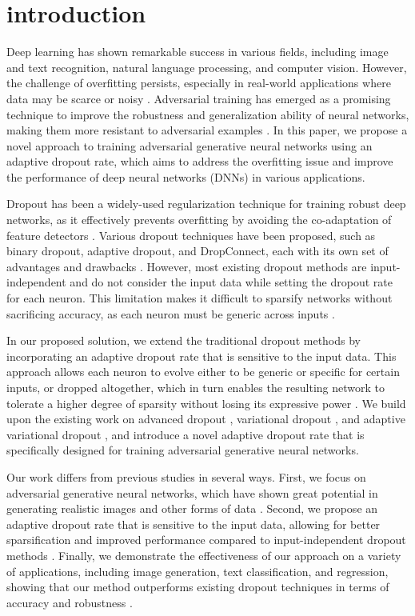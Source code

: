 \section{introduction}
Deep learning has shown remarkable success in various fields, including image and text recognition, natural language processing, and computer vision. However, the challenge of overfitting persists, especially in real-world applications where data may be scarce or noisy \cite{2010.05244}. Adversarial training has emerged as a promising technique to improve the robustness and generalization ability of neural networks, making them more resistant to adversarial examples \cite{2108.08976}. In this paper, we propose a novel approach to training adversarial generative neural networks using an adaptive dropout rate, which aims to address the overfitting issue and improve the performance of deep neural networks (DNNs) in various applications.

Dropout has been a widely-used regularization technique for training robust deep networks, as it effectively prevents overfitting by avoiding the co-adaptation of feature detectors \cite{1911.12675}. Various dropout techniques have been proposed, such as binary dropout, adaptive dropout, and DropConnect, each with its own set of advantages and drawbacks \cite{1805.10896}. However, most existing dropout methods are input-independent and do not consider the input data while setting the dropout rate for each neuron. This limitation makes it difficult to sparsify networks without sacrificing accuracy, as each neuron must be generic across inputs \cite{1805.10896, 2212.14149}.

In our proposed solution, we extend the traditional dropout methods by incorporating an adaptive dropout rate that is sensitive to the input data. This approach allows each neuron to evolve either to be generic or specific for certain inputs, or dropped altogether, which in turn enables the resulting network to tolerate a higher degree of sparsity without losing its expressive power \cite{2004.13342}. We build upon the existing work on advanced dropout \cite{2010.05244}, variational dropout \cite{1805.10896}, and adaptive variational dropout \cite{1805.08355}, and introduce a novel adaptive dropout rate that is specifically designed for training adversarial generative neural networks.

Our work differs from previous studies in several ways. First, we focus on adversarial generative neural networks, which have shown great potential in generating realistic images and other forms of data \cite{2303.15533}. Second, we propose an adaptive dropout rate that is sensitive to the input data, allowing for better sparsification and improved performance compared to input-independent dropout methods \cite{1805.10896, 2212.14149}. Finally, we demonstrate the effectiveness of our approach on a variety of applications, including image generation, text classification, and regression, showing that our method outperforms existing dropout techniques in terms of accuracy and robustness \cite{2010.05244, 2004.13342}.

